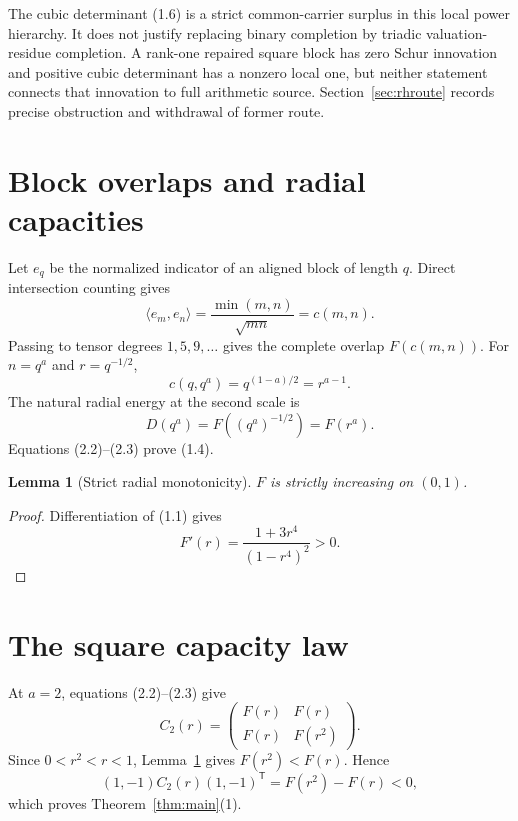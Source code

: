 \documentclass[11pt]{article}
\newtheorem{lemma}[theorem]{Lemma}
\theoremstyle{definition}
\theoremstyle{remark}
\begin{document}
The cubic determinant (1.6) is a strict common-carrier surplus in this local power hierarchy.
It does not justify replacing binary completion by triadic valuation-residue completion.
A rank-one repaired square block has zero Schur innovation and positive cubic determinant has a
nonzero local one, but neither statement connects that innovation to full arithmetic source.
Section~\ref{sec:rhroute} records precise obstruction and withdrawal of former route.

\section{Block overlaps and radial capacities}

Let $e_q$ be the normalized indicator of an aligned block of length $q$.  Direct intersection
counting gives
\[
 \langle e_m,e_n\rangle
 =\frac{\min(m,n)}{\sqrt{mn}}
 =c(m,n).                                               \tag{2.1}
\]
Passing to tensor degrees $1,5,9,\ldots$ gives the complete overlap $F(c(m,n))$.
For $n=q^a$ and $r=q^{-1/2}$,
\[
 c(q,q^a)=q^{(1-a)/2}=r^{a-1}.                         \tag{2.2}
\]
The natural radial energy at the second scale is
\[
 D(q^a)=F((q^a)^{-1/2})=F(r^a).                        \tag{2.3}
\]
Equations (2.2)--(2.3) prove (1.4).

\begin{lemma}[Strict radial monotonicity]
\label{lem:mono}
$F$ is strictly increasing on $(0,1)$.
\end{lemma}

\begin{proof}
Differentiation of (1.1) gives
\[
 F'(r)=\frac{1+3r^4}{(1-r^4)^2}>0.
\]
\end{proof}

\section{The square capacity law}

At $a=2$, equations (2.2)--(2.3) give
\[
 C_2(r)=
 \begin{pmatrix}
 F(r)&F(r)\\
 F(r)&F(r^2)
 \end{pmatrix}.                                       \tag{3.1}
\]
Since $0<r^2<r<1$, Lemma~\ref{lem:mono} gives $F(r^2)<F(r)$.  Hence
\[
 (1,-1)C_2(r)(1,-1)^{\mathsf T}=F(r^2)-F(r)<0,         \tag{3.2}
\]
which proves Theorem~\ref{thm:main}(1).
\end{document}
